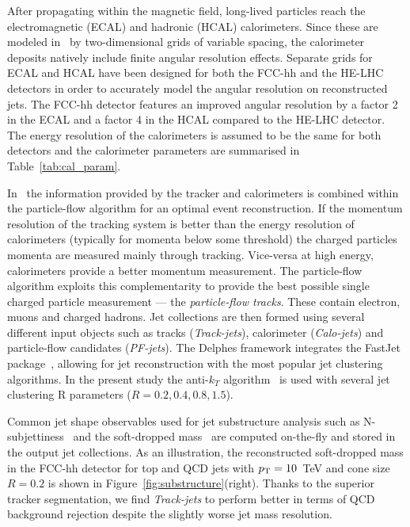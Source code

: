 \documentclass[a4paper,11pt]{article}
\begin{document}
After propagating within the magnetic field, long-lived particles reach the electromagnetic (ECAL) and hadronic (HCAL) calorimeters. Since these are modeled in \delphes{}~by two-dimensional grids of variable spacing, the calorimeter deposits natively include finite angular resolution effects. Separate grids for ECAL and HCAL have been designed for both the FCC-hh and the HE-LHC detectors in order to accurately model the angular resolution on reconstructed jets. The FCC-hh detector features an improved angular resolution by a factor 2 in the ECAL and a factor 4 in the HCAL compared to the HE-LHC detector. The energy resolution of the calorimeters is assumed to be the same for both detectors and the calorimeter parameters are summarised in Table~\ref{tab:cal_param}.

In \delphes{}~the information provided by the tracker and calorimeters is combined within the particle-flow algorithm for an optimal event reconstruction. If the momentum resolution of the tracking system is better than the energy resolution of calorimeters (typically for momenta below some threshold) the charged particles momenta are measured mainly through tracking. Vice-versa at high energy, calorimeters provide a better momentum measurement. The particle-flow algorithm exploits this complementarity to provide the best possible single charged particle measurement --- the \emph{particle-flow tracks}. These contain electron, muons and charged hadrons. Jet collections are then formed using several different input objects such as tracks (\emph{Track-jets}), calorimeter (\emph{Calo-jets}) and particle-flow candidates (\emph{PF-jets}). The Delphes framework integrates the FastJet package~\cite{Cacciari:2011ma}, allowing for jet reconstruction with the most popular jet clustering algorithms. In the present study the anti-$k_T$ algorithm~\cite{Cacciari:2008gp} is used with several jet clustering R parameters ($R=0.2, 0.4, 0.8, 1.5$).

Common jet shape observables used for jet substructure analysis such as N-subjettiness~\cite{Thaler:2010tr} and the soft-dropped mass~\cite{Larkoski:2014wba} are computed on-the-fly and stored in the output jet collections. As an illustration, the reconstructed soft-dropped mass in the FCC-hh detector for top and QCD jets with $p_{\text{T}}=10$~TeV and cone size $R=0.2$ is shown in Figure~\ref{fig:substructure}(right). Thanks to the superior tracker segmentation, we find \emph{Track-jets} to perform better in terms of QCD background rejection despite the slightly worse jet mass resolution.
\end{document}
